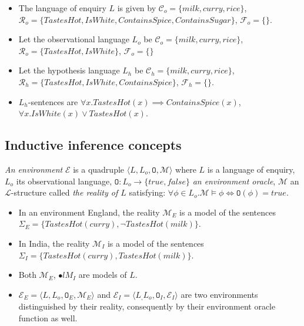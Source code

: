 \begin{exmp}
\begin{itemize}
\item The language of enquiry $L$ is given by $\mathcal{C}_o=\{milk, curry, rice\}$,$\mathcal{R}_o=\{TastesHot, IsWhite, ContainsSpice, ContainsSugar\}$, $\mathcal{F}_o=\{\}$.
\item Let the observational language $L_o$ be $\mathcal{C}_o=\{milk, curry, rice\}$,\\ $\mathcal{R}_o=\{TastesHot, IsWhite\}$, $\mathcal{F}_o=\{\}$
\item Let the hypothesis language $L_h$ be $\mathcal{C}_h=\{milk, curry, rice\}$,\\ $\mathcal{R}_h=\{TastesHot, IsWhite, ContainsSpice\}$, $\mathcal{F}_h=\{\}$.
\item $L_h$-sentences are $\forall x. TastesHot(x) \implies ContainsSpice(x)$,\\ $\forall x. IsWhite(x) \lor TastesHot(x)$.
\end{itemize}
\end{exmp}

\subsection{Inductive inference concepts}

\begin{defn}
\emph{An environment} $\mathcal{E}$ is a quadruple $\langle L, L_o, \mathtt{O}, \mathcal{M} \rangle$ where $L$ is a language of enquiry, $L_o$ its observational language, $\mathtt{O}:L_o \to \{true, false\}$ \emph{an environment oracle}, $\mathcal{M}$ an $\mathcal{L}$-structure called \emph{the reality of $L$} satisfying:
$\forall \phi \in L_o. \mathcal{M} \models \phi \iff \mathtt{O}(\phi)=true$.
\end{defn}

\begin{exmp}
\begin{itemize}
\item In an environment England, the reality $\mathcal{M}_E$ is a model of the sentences\\ $\Sigma_E=\{TastesHot(curry), \neg TastesHot(milk)\}$.
\item In India, the reality $\mathcal{M}_I$ is a model of the sentences\\ $\Sigma_I=\{TastesHot(curry), TastesHot(milk)\}$.
\item Both $\mathcal{M}_E$, $\mathcal{•}l{M}_I$ are models of $L$.
\item $\mathcal{E}_E=\langle L, L_o, \mathtt{O}_E, \mathcal{M}_E \rangle$ and
$\mathcal{E}_I=\langle L_, L_o, \mathtt{O}_I, \mathcal{E}_I \rangle$ are two environments distinguished by their reality, consequently by their environment oracle function as well.
\end{itemize}
\end{exmp}

